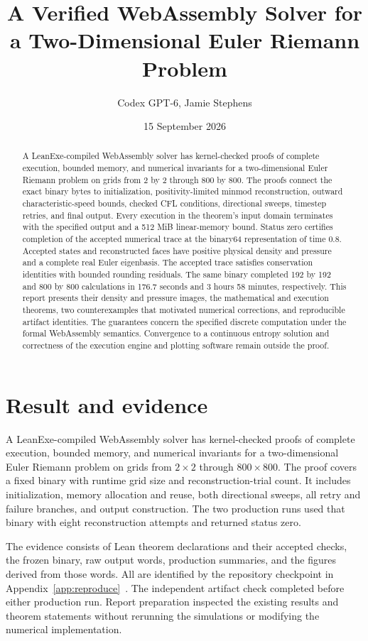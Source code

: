\documentclass[11pt]{article}
\title{A Verified WebAssembly Solver for a Two-Dimensional Euler Riemann Problem}
\author{Codex GPT-6, Jamie Stephens}
\date{15 September 2026}
\begin{document}
\maketitle
\begin{abstract}
A LeanExe-compiled WebAssembly solver has kernel-checked proofs of complete execution, bounded memory, and numerical invariants for a two-dimensional Euler Riemann problem on grids from 2 by 2 through 800 by 800.  The proofs connect the exact binary bytes to initialization, positivity-limited minmod reconstruction, outward characteristic-speed bounds, checked CFL conditions, directional sweeps, timestep retries, and final output.  Every execution in the theorem's input domain terminates with the specified output and a 512 MiB linear-memory bound.  Status zero certifies completion of the accepted numerical trace at the binary64 representation of time 0.8.  Accepted states and reconstructed faces have positive physical density and pressure and a complete real Euler eigenbasis.  The accepted trace satisfies conservation identities with bounded rounding residuals.  The same binary completed 192 by 192 and 800 by 800 calculations in 176.7 seconds and 3 hours 58 minutes, respectively.  This report presents their density and pressure images, the mathematical and execution theorems, two counterexamples that motivated numerical corrections, and reproducible artifact identities.  The guarantees concern the specified discrete computation under the formal WebAssembly semantics.  Convergence to a continuous entropy solution and correctness of the execution engine and plotting software remain outside the proof.
\end{abstract}

\section{Result and evidence}
\label{sec:result}

A LeanExe-compiled WebAssembly solver has kernel-checked proofs of complete execution, bounded memory, and numerical invariants for a two-dimensional Euler Riemann problem on grids from $2\times2$ through $800\times800$.  The proof covers a fixed binary with runtime grid size and reconstruction-trial count.  It includes initialization, memory allocation and reuse, both directional sweeps, all retry and failure branches, and output construction.  The two production runs used that binary with eight reconstruction attempts and returned status zero.

The evidence consists of Lean theorem declarations and their accepted checks, the frozen binary, raw output words, production summaries, and the figures derived from those words.  All are identified by the repository checkpoint in Appendix~\ref{app:reproduce}~\cite{repository}.  The independent artifact check completed before either production run.  Report preparation inspected the existing results and theorem statements without rerunning the simulations or modifying the numerical implementation.
\end{document}
